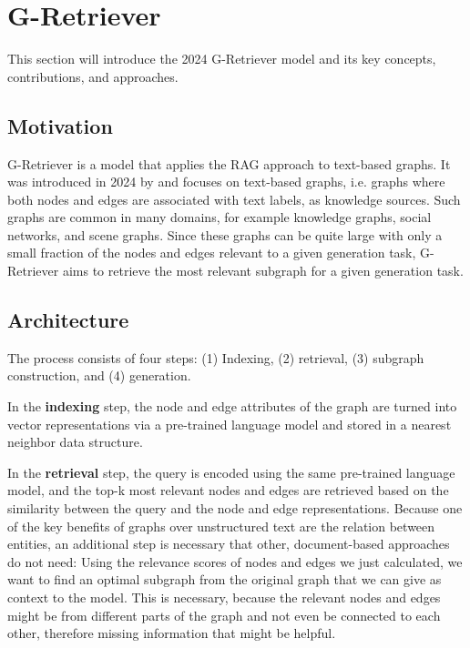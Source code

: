 \section{G-Retriever}

This section will introduce the 2024 G-Retriever model and its key concepts, contributions, and approaches.

\subsection{Motivation}
G-Retriever is a model that applies the RAG approach to text-based graphs.
It was introduced in 2024 by \cite{g-retriever} and focuses on text-based graphs, i.e. graphs where both nodes and edges are associated with text labels, as knowledge sources.
Such graphs are common in many domains, for example knowledge graphs, social networks, and scene graphs.
Since these graphs can be quite large with only a small fraction of the nodes and edges relevant to a given generation task, G-Retriever aims to retrieve the most relevant subgraph for a given generation task.

\subsection{Architecture}

The process consists of four steps: (1) Indexing, (2) retrieval, (3) subgraph construction, and (4) generation.

In the \textbf{indexing} step, the node and edge attributes of the graph are turned into vector representations via a pre-trained language model and stored in a nearest neighbor data structure.

In the \textbf{retrieval} step, the query is encoded using the same pre-trained language model, and the top-k most relevant nodes and edges are retrieved based on the similarity between the query and the node and edge representations.
Because one of the key benefits of graphs over unstructured text are the relation between entities, an additional step is necessary that other, document-based approaches do not need:
Using the relevance scores of nodes and edges we just calculated, we want to find an optimal subgraph from the original graph that we can give as context to the model.
This is necessary, because the relevant nodes and edges might be from different parts of the graph and not even be connected to each other, therefore missing information that might be helpful.

